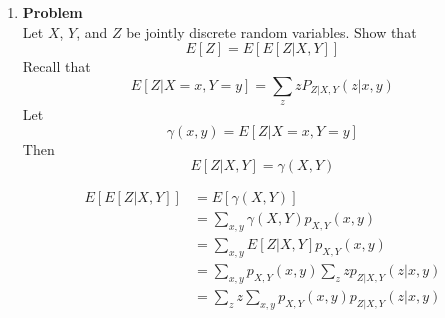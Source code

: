 \documentclass[12pt]{article}
\newenvironment{Ex}{\textbf{Problem}\vspace{.75em}\\}{}
\newcommand{\dd}[1]{\:\mathrm{d}{#1}}
\begin{document}
\begin{enumerate}
\begin{Ex}
\begin{solution}
      \begin{equation}
        \label{eq:1-conditional-expectation}
        \begin{aligned}
          E[X|Y] &= \int_y^1 x f_{X|Y}(x|y) \dd{x} \\
          &= \frac{1}{1-y} \int_y^1 x \dd{x} \\
          &= \frac{1}{1-y} \left[\frac{x^2}{2}\right]_y^1 \\
          &= \frac{1}{2(1-y)} (1-y^2) \\
          &= \frac{1}{2(1-y)} (1-y)(1+y) \\
          &= \frac{1+y}{2} \\
          \implies E[X|Y] &= \frac{1+Y}{2} \\
        \end{aligned}
      \end{equation}
      {\color{red} \huge FIND CONDITIONAL VARIANCE}
    \end{solution}
  \end{Ex}
\item
  \begin{Ex}
    Let $X$, $Y$, and $Z$ be jointly discrete random variables. Show
    that
    \begin{equation}
      \label{eq:2-question}
      E[Z] = E[E[Z|X,Y]]
    \end{equation}
    Recall that
    \begin{equation}
      \label{eq:2-recall}
      E[Z|X=x,Y=y] = \sum_z zP_{Z|X,Y}(z|x,y)
    \end{equation}
    Let
    \begin{equation}
      \label{eq:2-let}
      \gamma(x,y)=E[Z|X=x,Y=y]
    \end{equation}
    Then
    \begin{equation}
      \label{eq:2-then}
      E[Z|X,Y] = \gamma(X,Y)
    \end{equation}
    \begin{solution} \hfill
      \begin{equation}
        \label{eq:2-first-sum}
        \begin{aligned}
          E[E[Z|X,Y]] &= E[\gamma(X,Y)] \\
          &= \sum_{x,y} \gamma(X,Y)p_{X,Y}(x,y) \\
          &= \sum_{x,y} E[Z|X,Y] p_{X,Y}(x,y) \\
          &= \sum_{x,y} p_{X,Y}(x,y) \sum_{z} z p_{Z|X,Y}(z|x,y) \\
          &= \sum_{z} z \sum_{x,y} p_{X,Y}(x,y) p_{Z|X,Y}(z|x,y) \\

\end{aligned}
\end{equation}
\end{solution}
\end{Ex}
\end{enumerate}
\end{document}
